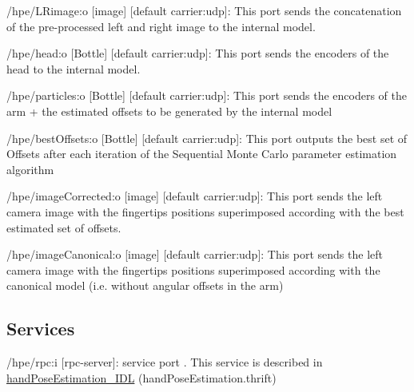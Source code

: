 \begin{DoxyItemize}
\item /hpe/\+L\+Rimage\+:o \mbox{[}image\mbox{]} \mbox{[}default carrier\+:udp\mbox{]}\+: This port sends the concatenation of the pre-\/processed left and right image to the internal model.
\item /hpe/head\+:o \mbox{[}Bottle\mbox{]} \mbox{[}default carrier\+:udp\mbox{]}\+: This port sends the encoders of the head to the internal model.
\item /hpe/particles\+:o \mbox{[}Bottle\mbox{]} \mbox{[}default carrier\+:udp\mbox{]}\+: This port sends the encoders of the arm + the estimated offsets to be generated by the internal model
\item /hpe/best\+Offsets\+:o \mbox{[}Bottle\mbox{]} \mbox{[}default carrier\+:udp\mbox{]}\+: This port outputs the best set of Offsets after each iteration of the Sequential Monte Carlo parameter estimation algorithm
\item /hpe/image\+Corrected\+:o \mbox{[}image\mbox{]} \mbox{[}default carrier\+:udp\mbox{]}\+: This port sends the left camera image with the fingertips positions superimposed according with the best estimated set of offsets.
\item /hpe/image\+Canonical\+:o \mbox{[}image\mbox{]} \mbox{[}default carrier\+:udp\mbox{]}\+: This port sends the left camera image with the fingertips positions superimposed according with the canonical model (i.\+e. without angular offsets in the arm)
\end{DoxyItemize}\hypertarget{group__handPoseEstimation-module_services_sec}{}\subsection{Services}\label{group__handPoseEstimation-module_services_sec}

\begin{DoxyItemize}
\item /hpe/rpc\+:i \mbox{[}rpc-\/server\mbox{]}\+: service port . This service is described in \hyperlink{classhandPoseEstimation__IDL}{hand\+Pose\+Estimation\+\_\+\+I\+DL} (hand\+Pose\+Estimation.\+thrift) 
\end{DoxyItemize}
